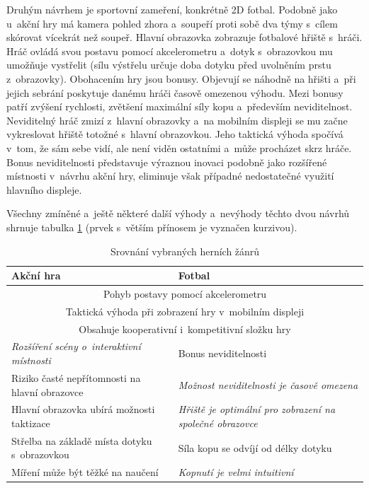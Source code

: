 \documentclass[thesis=B,czech,hidelinks]{FITthesis}[2012/06/26] %
\begin{document}
Druhým návrhem je sportovní zameření, konkrétně 2D fotbal. Podobně jako u~akční hry má kamera pohled zhora a~soupeří proti sobě dva týmy s~cílem skórovat vícekrát než soupeř. Hlavní obrazovka zobrazuje fotbalové hřiště s~hráči. Hráč ovládá svou postavu pomocí akcelerometru a~dotyk s~obrazovkou mu umožňuje vystřelit (sílu výstřelu určuje doba dotyku před uvolněním prstu z~obrazovky). Obohacením hry jsou bonusy. Objevují se náhodně na hřišti a~při jejich sebrání poskytuje danému hráči časově omezenou výhodu. Mezi bonusy patří zvýšení rychlosti, zvětšení maximální síly kopu a~především neviditelnost. Neviditelný hráč zmizí z~hlavní obrazovky a~na mobilním displeji se mu začne vykreslovat hřiště totožné s~hlavní obrazovkou. Jeho taktická výhoda spočívá v~tom, že sám sebe vidí, ale není viděn ostatními a~může procházet skrz hráče. Bonus neviditelnosti představuje výraznou inovaci podobně jako rozšířené místnosti v~návrhu akční hry, eliminuje však případné nedostatečné využití hlavního displeje.

Všechny zmíněné a~ještě některé další výhody a~nevýhody těchto dvou návrhů shrnuje tabulka \ref{table:game_comparison} (prvek s~větším přínosem je vyznačen kurzivou).

\begin{table}[h]
\caption{Srovnání vybraných herních žánrů}
\label{table:game_comparison}
\begin{tabularx}{\textwidth}{|X|X|}
\hline
\textbf{Akční hra} & \textbf{Fotbal} \\ \hline
\multicolumn{2}{|c|}{Pohyb postavy pomocí akcelerometru}\\ \hline
\multicolumn{2}{|c|}{Taktická výhoda při zobrazení hry v~mobilním displeji}\\ \hline
\multicolumn{2}{|c|}{Obsahuje kooperativní i~kompetitivní složku hry}\\ \hline
\emph{Rozšíření scény o~interaktivní místnosti} & Bonus neviditelnosti \\ \hline
Riziko časté nepřítomnosti na hlavní obrazovce & \emph{Možnost neviditelnosti je časově omezena} \\ \hline
Hlavní obrazovka ubírá možnosti taktizace & \emph{Hřiště je optimální pro zobrazení na společné obrazovce} \\ \hline

Střelba na základě místa dotyku s~obrazovkou & Síla kopu se odvíjí od délky dotyku \\ \hline
Míření může být těžké na naučení & \emph{Kopnutí je velmi intuitivní} \\ \hline
\end{tabularx}
\end{table}
\end{document}
